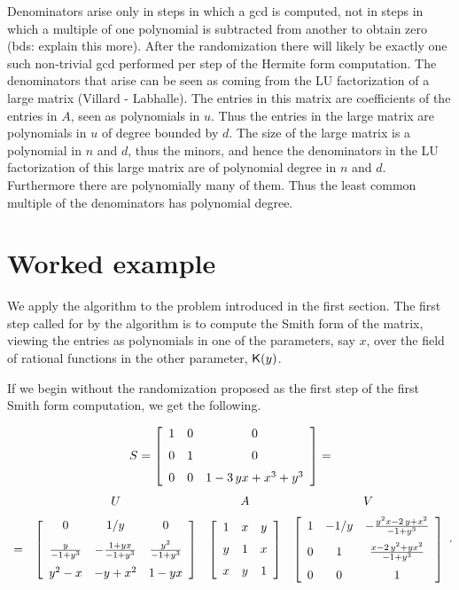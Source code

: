Denominators arise only in steps in which a gcd is computed, not in steps in which a
multiple of one polynomial is subtracted from another to obtain zero (bds: explain this more).  After the 
randomization there will likely be exactly one such non-trivial gcd performed per
step of the Hermite form computation.  The denominators that arise can be seen as coming
from the LU factorization of a large matrix (Villard - Labhalle).  The entries in this matrix
are coefficients of the entries in $A$, seen as polynomials in $u$.  Thus the entries in the
large matrix are polynomials in $u$ of degree bounded by $d$.  The size of the large matrix
is a polynomial in $n$ and $d$, thus the minors, and hence the denominators in the LU factorization
of this large matrix are of polynomial degree in $n$ and $d$.  Furthermore there are polynomially
many of them.  Thus the least common multiple of the denominators has polynomial degree.

\newpage
\section{Worked example}
We apply the algorithm to the problem introduced in the first section.
The first step called for by the algorithm is to compute the Smith form of the 
matrix, viewing the entries as polynomials in one of the parameters, say $x$, over the field
of rational functions in the other parameter, ${\mathsf K}(y)$.  

If we begin without the randomization proposed as the first step of the first Smith form
computation, we get the following.


\[
S =  
\left [\begin {array}{ccc} 
1&0&0 \\\noalign{\medskip}
0&1&0 \\\noalign{\medskip}
0&0&1-3\,yx+{x}^{3}+{y}^{3}\end {array}\right ] 
= 
\]\[
\begin{array}{cccc}
~ & U & A & V\\\noalign{\medskip}
= &
\left [\begin {array}{ccc} 
0&1/y&0\\\noalign{\medskip}
{\frac {y}{-1+{y}^{3}}}&-{\frac {1+yx}{-1+{y}^{3}}}&{\frac {{y}^{2}}{-1+{y}^{3}}}\\\noalign{\medskip}
{y}^{2}-x&-y+{x}^{2}&1-yx\end {array}\right ]
&
\left [\begin {array}{ccc} 
1&x&y\\\noalign{\medskip}
y&1&x\\\noalign{\medskip}
x&y&1\end {array}\right ]
&
\left [\begin {array}{ccc} 1&-1/y&-{\frac {{y}^{2}x-2\,y+{x}^{2}}{
-1+{y}^{3}}}\\\noalign{\medskip}0&1&{\frac {x-2\,{y}^{2}+y{x}^{2}}{-1+{
y}^{3}}}\\\noalign{\medskip}0&0&1\end {array}\right ]
\end{array}.
\]

